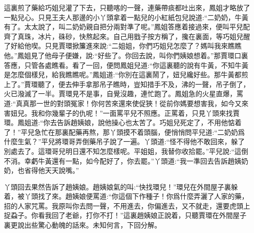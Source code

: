 \begin{parag}
    這裏煎了藥給巧姐兒灌了下去，只聽喀的一聲，連藥帶痰都吐出來，鳳姐才略放了一點兒心。只見王夫人那邊的小丫頭拿着一點兒的小紅紙包兒說道:“二奶奶，牛黃有了。太太說了，叫二奶奶親自把分兩對準了呢。”鳳姐答應着接過來，便叫平兒配齊了真珠，冰片，硃砂，快熬起來。自己用戥子按方稱了，攙在裏面，等巧姐兒醒了好給他喫。只見賈環掀簾進來說:“二姐姐，你們巧姐兒怎麼了？媽叫我來瞧瞧他。”鳳姐見了他母子便嫌，說:“好些了。你回去說，叫你們姨娘想着。”那賈環口裏答應，只管各處瞧看。看了一回，便問鳳姐兒道:“你這裏聽的說有牛黃，不知牛黃是怎麼個樣兒，給我瞧瞧呢。”鳳姐道:“你別在這裏鬧了，妞兒纔好些。那牛黃都煎上了。”賈環聽了，便去伸手拿那吊子瞧時，豈知措手不及，沸的一聲，吊子倒了，火已潑滅了一半。賈環見不是事，自覺沒趣，連忙跑了。鳳姐急的火星直爆，罵道:“真真那一世的對頭冤家！你何苦來還來使促狹！從前你媽要想害我，如今又來害妞兒。我和你幾輩子的仇呢！”一面罵平兒不照應。正罵着，只見丫頭來找賈環。鳳姐道:“你去告訴趙姨娘，說他操心也太苦了。巧姐兒死定了，不用他惦着了！”平兒急忙在那裏配藥再熬，那丫頭摸不着頭腦，便悄悄問平兒道:“二奶奶爲什麼生氣？”平兒將環哥弄倒藥吊子說了一遍。丫頭道:“怪不得他不敢回來，躲了別處去了。這環哥兒明日還不知怎麼樣呢。平姐姐，我替你收拾罷。”平兒說:“這倒不消。幸虧牛黃還有一點，如今配好了，你去罷。”丫頭道:“我一準回去告訴趙姨奶奶，也省得他天天說嘴。”
\end{parag}


\begin{parag}
    丫頭回去果然告訴了趙姨娘。趙姨娘氣的叫:“快找環兒！”環兒在外間屋子裏躲着，被丫頭找了來。趙姨娘便罵道:“你這個下作種子！你爲什麼弄灑了人家的藥，招的人家咒罵。我原叫你去問一聲，不用進去，你偏進去，又不就走，還要虎頭上捉蝨子。你看我回了老爺，打你不打！”這裏趙姨娘正說着，只聽賈環在外間屋子裏更說出些驚心動魄的話來。未知何言，下回分解。
\end{parag}